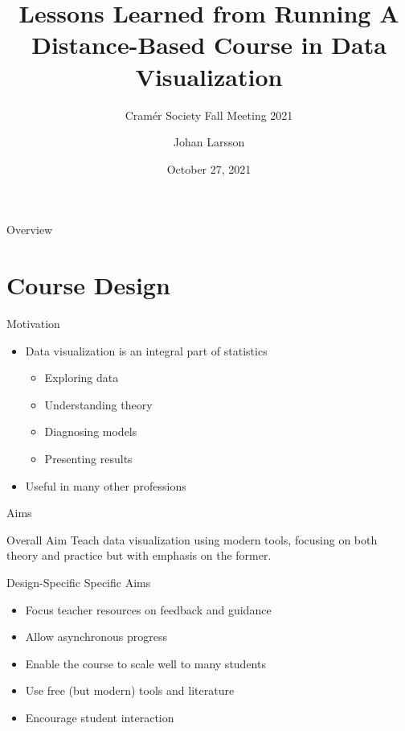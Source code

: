 



\title{Lessons Learned from Running A Distance-Based Course in Data
  Visualization}
\subtitle{Cramér Society Fall Meeting 2021}
\author{Johan Larsson}
\date{October 27, 2021}



\begin{frame}{Overview}
  \tableofcontents
\end{frame}

\section{Course Design}

\begin{frame}{Motivation}
  \begin{itemize}
    \item Data visualization is an integral part of statistics
          \begin{itemize}
            \item Exploring data
            \item Understanding theory
            \item Diagnosing models
            \item Presenting results
          \end{itemize}
    \item Useful in many other professions
  \end{itemize}
\end{frame}

\begin{frame}{Aims}
  \begin{block}{Overall Aim}
    Teach data visualization using modern tools, focusing on both theory and
    practice but with emphasis on the former.
  \end{block}

  \begin{block}{Design-Specific Specific Aims}
    \begin{itemize}
      \item Focus teacher resources on feedback and guidance
      \item Allow asynchronous progress
      \item Enable the course to scale well to many students
      \item Use free (but modern) tools and literature
      \item Encourage student interaction
    \end{itemize}
  \end{block}
\end{frame}

